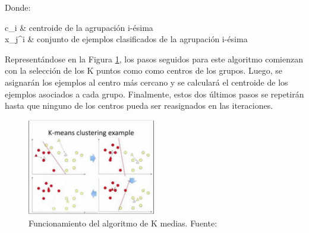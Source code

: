 \begin{itemize}
	Donde:
	\begin{conditions}
		c_i   &  centroide de la agrupación i-ésima \\
		x_j^i   &  conjunto de ejemplos clasificados de la agrupación i-ésima
	\end{conditions}
	
	Representándose en la Figura \ref{2:fig3}, los pasos seguidos para este algoritmo comienzan con la selección de los K puntos como como centros de los grupos. Luego, se asignarán los ejemplos al centro más cercano y se calculará el centroide de los ejemplos asociados a cada grupo. Finalmente, estos dos últimos pasos se repetirán hasta que ninguno de los centros pueda ser reasignados en las iteraciones.
	\begin{figure}[h]
		\begin{center}
			\includegraphics[width=0.50\textwidth]{2/figures/kmeans.jpg}
			\caption[Funcionamiento del algoritmo de K medias]{Funcionamiento del algoritmo de K medias. Fuente: \cite{tec_sancho2018supnosup}}
			\label{2:fig3}
		\end{center}
	\end{figure}
		

\end{itemize}
